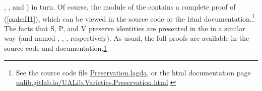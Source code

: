 \documentclass[a4paper,UKenglish,cleveref,autoref,thm-restate]{lipics-v2021}
\begin{document}
, , and ) in turn. Of course, the \ualibPreservation module of the \ualib contains a complete proof of (\ref{code:H1}), which can be viewed in the source code or the html documentation.\footnote{\label{note1}See the source code file \href{https://gitlab.com/ualib/ualib.gitlab.io/-/blob/master/UALib/Varieties/Preservation.lagda}{Preservation.lagda}, or the html documentation page\\ \href{https://ualib.gitlab.io/UALib.Varieties.Preservation.html}{ualib.gitlab.io/UALib.Varieties.Preservation.html}.}
The facts that \ad S, \ad P, and \ad V preserve identities are presented in the \ualib in a similar way (and named , , , respectively). As usual, the full proofs are available in the \ualib source code and documentation.\cref{note1}%
\end{document}

